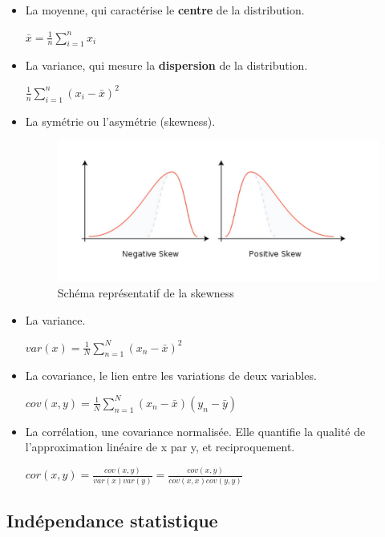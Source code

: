 \documentclass{article}
\begin{document}
\begin{itemize}
\item La moyenne, qui caractérise le \textbf{centre} de la distribution.

$ \bar{x} = \frac{1}{n} \sum_{i=1}^{n} x_i $

\item La variance, qui mesure la \textbf{dispersion} de la distribution.

$ \frac{1}{n} \sum_{i=1}^{n} (x_i - \bar{x})^{2} $

\item La symétrie ou l'asymétrie (skewness).

\begin{figure}[H]
   \caption{Schéma représentatif de la skewness}
    \begin{center} \includegraphics[scale=0.4]{skewness.png} \end{center}
\end{figure}

\item La variance.

$ var(x) = \frac{1}{N} \sum_{n=1}^{N} (x_n - \bar{x})^2 $

\item La covariance, le lien entre les variations de deux variables.

$ cov(x, y) = \frac{1}{N} \sum_{n=1}^{N} (x_n - \bar{x}) (y_n - \bar{y}) $

\item La corrélation, une covariance normalisée. Elle quantifie la qualité de l'approximation linéaire de x par y, et reciproquement.

$ cor(x, y) = \frac{cov(x, y)}{var(x) var(y)} = \frac{cov(x, y)}{cov(x, x) cov(y, y)} $

\end{itemize}

\subsection{Indépendance statistique}
\end{document}
